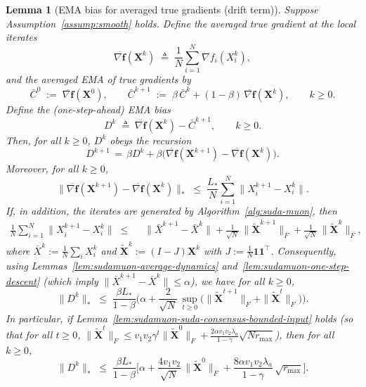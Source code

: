 \documentclass{article}
\newtheorem{lemma}{Lemma}
\begin{document}
\begin{lemma}[EMA bias for averaged true gradients (drift term)]
\label{lem:sudamuon-ema-drift-average}
Suppose Assumption~\ref{assump:smooth} holds.
Define the averaged true gradient at the local iterates
\[
    \overline{\nabla \mathbf f}(\mathbf X^k)
    \;\triangleq\; \frac{1}{N}\sum_{i=1}^N \nabla f_i(X_i^k),
\]
and the averaged EMA of true gradients by
\[
    \bar C^0 \;:=\; \overline{\nabla \mathbf f}(\mathbf X^0),
    \qquad
    \bar C^{k+1} \;:=\; \beta\,\bar C^k+(1-\beta)\,\overline{\nabla \mathbf f}(\mathbf X^k),\qquad k\ge 0.
\]
Define the (one-step-ahead) EMA bias
\[
    D^k \;\triangleq\; \overline{\nabla \mathbf f}(\mathbf X^k)-\bar C^{k+1},\qquad k\ge 0.
\]
Then, for all $k\ge 0$, $D^k$ obeys the recursion
\[
    D^{k+1}
    \,=\, \beta D^k + \beta\bigl(\overline{\nabla \mathbf f}(\mathbf X^{k+1})-\overline{\nabla \mathbf f}(\mathbf X^{k})\bigr).
\]
Moreover, for all $k\ge 0$,
\begin{equation}
\label{eq:sudamuon-avg-grad-drift-one-step}
\bigl\|\overline{\nabla \mathbf f}(\mathbf X^{k+1})-\overline{\nabla \mathbf f}(\mathbf X^{k})\bigr\|_*
\;\le\; \frac{L_*}{N}\sum_{i=1}^N \|X_i^{k+1}-X_i^k\|.
\end{equation}
If, in addition, the iterates are generated by Algorithm~\ref{alg:suda-muon}, then
\begin{equation}
\label{eq:sudamuon-avg-step-split-consensus}
\begin{split}
\frac{1}{N}\sum_{i=1}^N \|X_i^{k+1}-X_i^k\|
\;\le\;&\;
\|\bar X^{k+1}-\bar X^k\|
+ \frac{1}{\sqrt N}\,\|\tilde{\mathbf X}^{k+1}\|_F
+ \frac{1}{\sqrt N}\,\|\tilde{\mathbf X}^{k}\|_F,
\end{split}
\end{equation}
where $\bar X^k:=\tfrac1N\sum_i X_i^k$ and $\tilde{\mathbf X}^k:=(I-J)\mathbf X^k$ with $J:=\tfrac1N\mathbf{1}\mathbf{1}^\top$.
Consequently, using Lemmas~\ref{lem:sudamuon-average-dynamics} and~\ref{lem:sudamuon-one-step-descent} (which imply $\|\bar X^{k+1}-\bar X^k\|\le \alpha$), we have for all $k\ge 0$,
\begin{equation}
\label{eq:sudamuon-Dk-sup-bound}
\|D^k\|_*
\;\le\;
\frac{\beta L_*}{1-\beta}
\Big(
\alpha
+ \frac{2}{\sqrt N}\,\sup_{t\ge 0}\bigl(\|\tilde{\mathbf X}^{t+1}\|_F+\|\tilde{\mathbf X}^{t}\|_F\bigr)
\Big).
\end{equation}
In particular, if Lemma~\ref{lem:sudamuon-suda-consensus-bounded-input} holds (so that for all $t\ge 0$,
$\|\tilde{\mathbf X}^{t}\|_F\le v_1v_2\gamma^t\|\tilde{\mathbf X}^0\|_F + \tfrac{2\alpha v_1v_2\lambda_a}{1-\gamma}\sqrt{Nr_{\max}}$), then for all $k\ge 0$,
\begin{equation}
\label{eq:sudamuon-Dk-explicit}
\|D^k\|_*
\;\le\;
\frac{\beta L_*}{1-\beta}
\Bigg[
\alpha
+ \frac{4v_1v_2}{\sqrt N}\,\|\tilde{\mathbf X}^0\|_F
+ \frac{8\alpha v_1v_2\lambda_a}{1-\gamma}\,\sqrt{r_{\max}}
\Bigg].
\end{equation}
\end{lemma}
\end{document}
